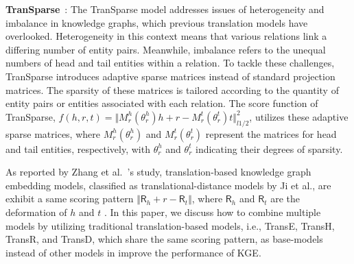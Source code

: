 \documentclass{article}
\begin{document}
\textbf{TranSparse}~\cite{ji2016knowledge}: The TranSparse model addresses issues of heterogeneity and imbalance in knowledge graphs, which previous translation models have overlooked. Heterogeneity in this context means that various relations link a differing number of entity pairs. Meanwhile, imbalance refers to the unequal numbers of head and tail entities within a relation. To tackle these challenges, TranSparse introduces adaptive sparse matrices instead of standard projection matrices. The sparsity of these matrices is tailored according to the quantity of entity pairs or entities associated with each relation. The score function of TranSparse, $f(h,r,t) = \Vert M^h_r (\theta^h_r)h + r - M^t_r (\theta^t_r)t\Vert_{l1/2}^2$, utilizes these adaptive sparse matrices, where $M^h_r (\theta^h_r)$ and $M^t_r (\theta^t_r)$ represent the matrices for head and tail entities, respectively, with $\theta^h_r$ and $\theta^t_r$ indicating their degrees of sparsity.

As reported by Zhang et al.~\cite{zhang-etal-2022-trans}'s study, translation-based knowledge graph embedding models, classified as translational-distance models by Ji et al.\cite{ji2021survey}, are exhibit a same scoring pattern $\Vert \mathsf{R}_h + r - \mathsf{R}_t \Vert$, where $\mathsf{R}_h$ and $\mathsf{R}_t$ are the deformation of $h$ and $t$ . In this paper, we discuss how to combine multiple models by utilizing traditional translation-based models, i.e., TransE, TransH, TransR, and TransD, which share the same scoring pattern, as base-models instead of other models in improve the performance of KGE.  


\end{document}
